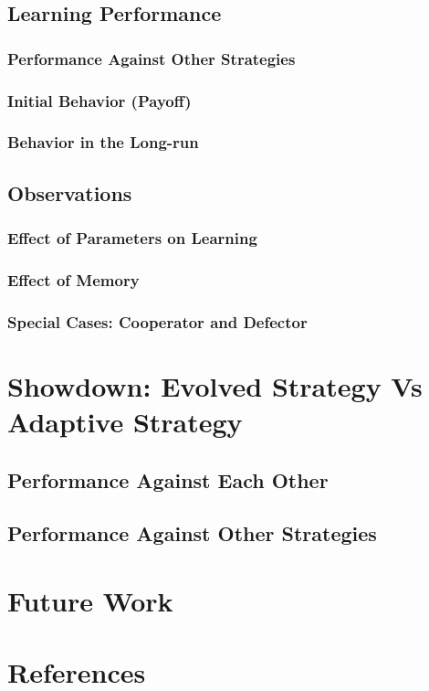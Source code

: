 \documentclass[a4paper]{article}
\begin{document}
	\subsection{Learning Performance}
		
	\subsubsection{Performance Against Other Strategies}
	\subsubsection{Initial Behavior (Payoff)}
	\subsubsection{Behavior in the Long-run}

	\subsection{Observations}
	
	\subsubsection{Effect of Parameters on Learning}
	\subsubsection{Effect of Memory}
	\subsubsection{Special Cases: Cooperator and Defector}

	\section{Showdown: Evolved Strategy Vs Adaptive Strategy}

	\subsection{Performance Against Each Other}
	\subsection{Performance Against Other Strategies}

	\section{Future Work}
			
	\section{References}
\end{document}
